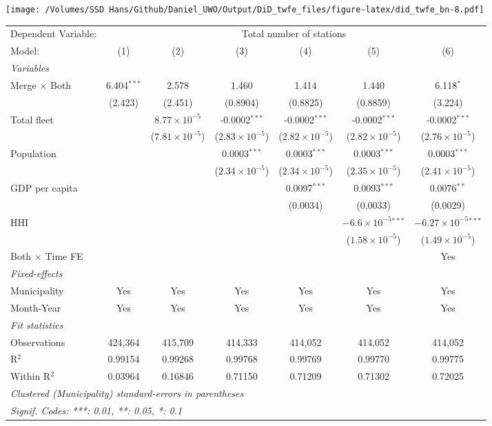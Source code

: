 \documentclass[
]{article}
\begin{document}
\texttt{[image: /Volumes/SSD Hans/Github/Daniel\_UWO/Output/DiD\_twfe\_files/figure-latex/did\_twfe\_bn-8.pdf]}

\begin{tabular}{lcccccc}
\tabularnewline\midrule\midrule
Dependent Variable:&\multicolumn{6}{c}{Total number of stations}\\
Model:&(1) & (2) & (3) & (4) & (5) & (6)\\
\midrule \emph{Variables}&   &   &   &   &   &  \\
Merge $\times $ Both & 6.404$^{***}$ & 2.578 & 1.460 & 1.414 & 1.440 & 6.118$^{*}$\\
  &(2.423) & (2.451) & (0.8904) & (0.8825) & (0.8859) & (3.224)\\
Total fleet &    & $8.77\times 10^{-5}$ & -0.0002$^{***}$ & -0.0002$^{***}$ & -0.0002$^{***}$ & -0.0002$^{***}$\\
  &   & ($7.81\times 10^{-5}$) & ($2.83\times 10^{-5}$) & ($2.82\times 10^{-5}$) & ($2.82\times 10^{-5}$) & ($2.76\times 10^{-5}$)\\
Population &    &    & 0.0003$^{***}$ & 0.0003$^{***}$ & 0.0003$^{***}$ & 0.0003$^{***}$\\
  &   &    & ($2.34\times 10^{-5}$) & ($2.34\times 10^{-5}$) & ($2.35\times 10^{-5}$) & ($2.41\times 10^{-5}$)\\
GDP per capita &    &    &    & 0.0097$^{***}$ & 0.0093$^{***}$ & 0.0076$^{**}$\\
  &   &    &    & (0.0034) & (0.0033) & (0.0029)\\
HHI &    &    &    &    & $-6.6\times 10^{-5}$$^{***}$ & $-6.27\times 10^{-5}$$^{***}$\\
  &   &    &    &    & ($1.58\times 10^{-5}$) & ($1.49\times 10^{-5}$)\\
Both $\times$ Time FE &  &  &  &  &  & Yes\\
\midrule \emph{Fixed-effects}&   &   &   &   &   &  \\
Municipality & Yes & Yes & Yes & Yes & Yes & Yes\\
Month-Year & Yes & Yes & Yes & Yes & Yes & Yes\\
\midrule \emph{Fit statistics}&  & & & & & \\
Observations & 424,364&415,709&414,333&414,052&414,052&414,052\\
R$^2$ & 0.99154&0.99268&0.99768&0.99769&0.99770&0.99775\\
Within R$^2$ & 0.03964&0.16846&0.71150&0.71209&0.71302&0.72025\\
\midrule\midrule\multicolumn{7}{l}{\emph{Clustered (Municipality) standard-errors in parentheses}}\\
\multicolumn{7}{l}{\emph{Signif. Codes: ***: 0.01, **: 0.05, *: 0.1}}\\
\end{tabular}
\end{document}
